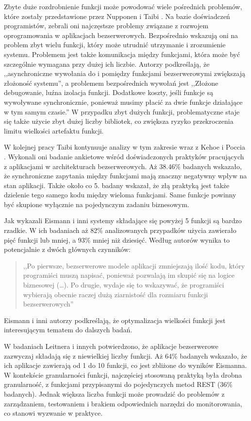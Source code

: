 Zbyte duże rozdrobnienie funkcji może powodować wiele pośrednich problemów, które zostały przedstawione przez Nupponen i Taibi \cite{9095731}.
Na bazie doświadczeń programistów, zebrali oni najczęstsze problemy związane z rozwojem oprogramowania w aplikacjach bezserwerowych.
Bezpośrednio wskazują oni na problem zbyt wielu funkcji, który może utrudnić utrzymanie i zrozumienie systemu.
Problemem jest także komunikacja między funkcjami, która może być szczególnie wymagana przy dużej ich liczbie. 
Autorzy podkreślają, że ,,asynchroniczne wywołania do i pomiędzy funkcjami bezserwerowymi zwiększają złożoność systemu''\cite{9095731}, 
a problemem bezpośrednich wywołań jest ,,Złożone debugowanie, luźna izolacja funkcji. Dodatkowe koszty, jeśli funkcje są wywoływane synchronicznie, ponieważ musimy płacić za dwie funkcje działające w tym samym czasie.''\cite{9095731}
W przypadku zbyt dużych funkcji, problematyczne staje się także użycie zbyt dużej liczby bibliotek, co zwiększa ryzyko przekroczenia limitu wielkości artefaktu funkcji.

W kolejnej pracy Taibi kontynuuje analizy w tym zakresie wraz z Kehoe i Poccia \cite{9912641}. 
Wykonali oni badanie ankietowe wśród doświadczonych praktyków pracujących z aplikacjami w architekturach bezserwerowych.
Aż 38.46\% badanych wskazało, że synchroniczne zapytania między funkcjami mają znaczny negatywny wpływ na stan aplikacji.
Także około co 5. badany wskazał, że złą praktyką jest także dzielenie tego samego kodu między wieloma funkcjami.
Same funkcje powinny być skupione wyłącznie na pojedynczym zadaniu biznesowym.

Jak wykazali Eismann i inni \cite{eismann2021reviewserverlessusecases} systemy składające się powyżej 5 funkcji są bardzo rzadkie.
W ich badaniach aż 82\% analizowanych przypadków użycia zawierało pięć funkcji lub mniej, a 93\% mniej niż dziesięć. 
Według autorów wynika to potencjalnie z dwóch głównych czynników:
\begin{quote}
    ,,Po pierwsze, bezserwerowe modele aplikacji zmniejszają ilość kodu, który programiści muszą napisać, ponieważ pozwalają im skupić się na logice biznesowej (\dots). Po drugie, wydaje się to wskazywać, że programiści wybierają obecnie raczej dużą ziarnistość dla rozmiaru funkcji bezserwerowych'' \cite{eismann2021reviewserverlessusecases}
\end{quote}
Eismann i inni autorzy podkreślają, że optymalizacja wielkości funkcji jest interesującym tematem do dalszych badań.

W badaniach Leitnera i innych \cite{LEITNER2019340} potwierdzono, że aplikacje bezserwerowe zazwyczaj składają się z niewielkiej liczby funkcji.
Aż 64\% badanych wskazało, że ich aplikacje zawierają od 1 do 10 funkcji, co jest zbliżone do wyników Eismanna.
W kontekście granularności funkcji, najczęściej stosowaną praktyką była drobna granularność, z funkcjami przypisanymi do pojedynczych metod REST (36\% badanych).
Jednak większa liczba funkcji może prowadzić do problemów z zarządzaniem, testowaniem i brakiem odpowiednich narzędzi do monitorowania, co stanowi wyzwanie w praktyce.

